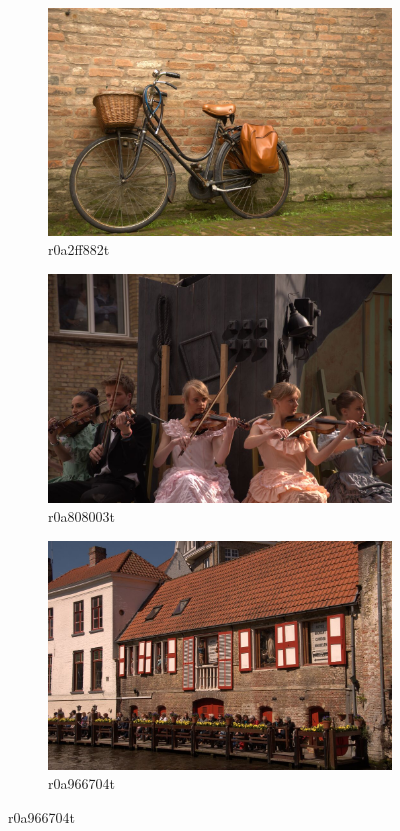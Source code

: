 \documentclass{ipol}
\begin{document}
\begin{figure}[ht]
    \begin{subfigure}[c]{.31\linewidth}\centering
    \includegraphics[width=\linewidth]{images/original/r0a2ff882t.jpeg}
    \caption{r0a2ff882t}
    \end{subfigure}\hfill%
    \begin{subfigure}[c]{.31\linewidth}\centering
    \includegraphics[width=\linewidth]{images/original/r0a808003t.jpeg}
    \caption{r0a808003t}
    \end{subfigure}\hfill%
    \begin{subfigure}[c]{.31\linewidth}\centering
    \includegraphics[width=\linewidth]{images/original/r0a966704t.jpeg}
    \caption{r0a966704t}
    \end{subfigure}
    

\end{figure}
\end{document}
